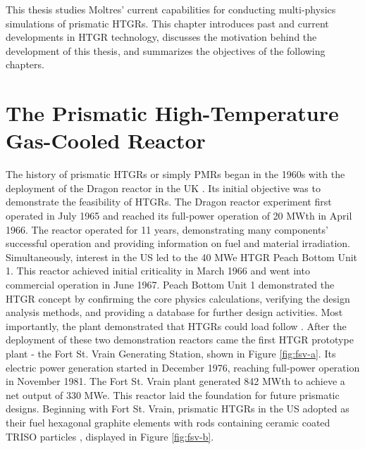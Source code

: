 This thesis studies Moltres' current capabilities for conducting multi-physics simulations of prismatic \glspl{HTGR}.
This chapter introduces past and current developments in \gls{HTGR} technology, discusses the motivation behind the development of this thesis, and summarizes the objectives of the following chapters.

\section{The Prismatic High-Temperature Gas-Cooled Reactor}
\label{sec:pmr}

The history of prismatic \glspl{HTGR} or simply \glspl{PMR} began in the 1960s with the deployment of the Dragon reactor in the \gls{UK} \cite{brey_development_2001}.
Its initial objective was to demonstrate the feasibility of \glspl{HTGR}.
The Dragon reactor experiment first operated in July 1965 and reached its full-power operation of 20 MWth in April 1966.
The reactor operated for 11 years, demonstrating many components' successful operation and providing information on fuel and material irradiation.
Simultaneously, interest in the \gls{US} led to the 40 MWe \gls{HTGR} Peach Bottom Unit 1.
This reactor achieved initial criticality in March 1966 and went into commercial operation in June 1967.
Peach Bottom Unit 1 demonstrated the \gls{HTGR} concept by confirming the core physics calculations, verifying the design analysis methods, and providing a database for further design activities.
Most importantly, the plant demonstrated that \glspl{HTGR} could load follow \cite{brey_development_2001}.
After the deployment of these two demonstration reactors came the first \gls{HTGR} prototype plant - the Fort St. Vrain Generating Station, shown in Figure \ref{fig:fsv-a}.
Its electric power generation started in December 1976, reaching full-power operation in November 1981.
The Fort St. Vrain plant generated 842 MWth to achieve a net output of 330 MWe.
This reactor laid the foundation for future prismatic designs.
Beginning with Fort St. Vrain, prismatic HTGRs in the \gls{US} adopted as their fuel hexagonal graphite elements with rods containing ceramic coated \gls{TRISO} particles \cite{brey_development_2001}, displayed in Figure \ref{fig:fsv-b}.

